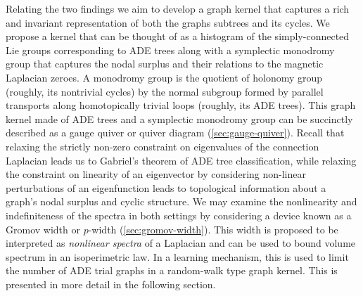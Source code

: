 \documentclass{article}
\theoremstyle{definition}
\begin{document}
Relating the two findings we aim to develop a graph kernel that captures a rich and invariant representation of both the graphs subtrees and its cycles.
We propose a kernel that can be thought of as a histogram of the simply-connected Lie groups corresponding to ADE trees along with a symplectic monodromy group that captures the nodal surplus and their relations to the magnetic Laplacian zeroes.
A monodromy group is the quotient of holonomy group (roughly, its nontrivial cycles) by the normal subgroup formed by parallel transports along homotopically trivial loops (roughly, its ADE trees).
This graph kernel made of ADE trees and a symplectic monodromy group can be succinctly described as a gauge quiver or quiver diagram (\cref{sec:gauge-quiver}).
Recall that relaxing the strictly non-zero constraint on eigenvalues of the connection Laplacian leads us to Gabriel's theorem of ADE tree classification, while relaxing the constraint on linearity of an eigenvector by considering non-linear perturbations of an eigenfunction leads to topological information about a graph's nodal surplus and cyclic structure.
We may examine the nonlinearity and indefiniteness of the spectra in both settings by considering a device known as a Gromov width or $p$-width (\cref{sec:gromov-width}).
This width is proposed to be interpreted as \textit{nonlinear spectra} of a Laplacian and can be used to bound volume spectrum in an isoperimetric law.
In a learning mechanism, this is used to limit the number of ADE trial graphs in a random-walk type graph kernel. This is presented in more detail in the following section.


\end{document}
